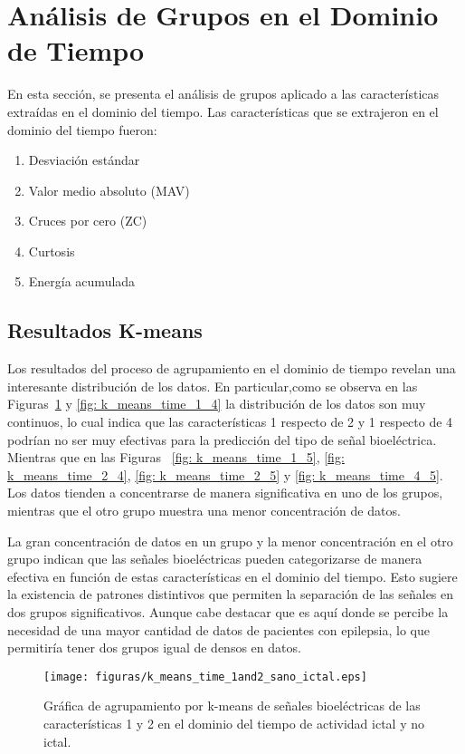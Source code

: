 \section{Análisis de Grupos en el Dominio de Tiempo}
En esta sección, se presenta el análisis de grupos aplicado a las características extraídas en el dominio del tiempo. 
Las características que se extrajeron en el dominio del tiempo fueron:
\begin{enumerate}
    \item Desviación estándar
    \item Valor medio absoluto (MAV)
    \item Cruces por cero (ZC)
    \item Curtosis
    \item Energía acumulada
\end{enumerate}

\subsection{Resultados K-means}

Los resultados del proceso de agrupamiento en el dominio de tiempo revelan una interesante distribución de los datos. En particular,como se observa en las Figuras~\ref{fig: k_means_Time_1_2} y \ref{fig: k_means_time_1_4} la distribución de los datos son muy continuos, lo cual indica que las características 1 respecto de 2 y 1 respecto de 4 podrían no ser muy efectivas para la predicción del tipo de señal bioeléctrica. Mientras que en las Figuras ~\ref{fig: k_means_time_1_5}, \ref{fig: k_means_time_2_4}, \ref{fig: k_means_time_2_5} y \ref{fig: k_means_time_4_5}. Los datos tienden a concentrarse de manera significativa en uno de los grupos, mientras que el otro grupo muestra una menor concentración de datos. 

La gran concentración de datos en un grupo y la menor concentración en el otro grupo indican que las señales bioeléctricas pueden categorizarse de manera efectiva en función de estas características en el dominio del tiempo. Esto sugiere la existencia de patrones distintivos que permiten la separación de las señales en dos grupos significativos. Aunque cabe destacar que es aquí donde se percibe la necesidad de una mayor cantidad de datos de pacientes con epilepsia, lo que permitiría tener dos grupos igual de densos en datos. 

\begin{figure}[H]
    \centering
    \texttt{[image: figuras/k\_means\_time\_1and2\_sano\_ictal.eps]}
    \caption{Gráfica de agrupamiento por k-means de señales bioeléctricas de las características 1 y 2 en el dominio del tiempo  de actividad ictal y no ictal.}
    \label{fig: k_means_Time_1_2}
\end{figure}

